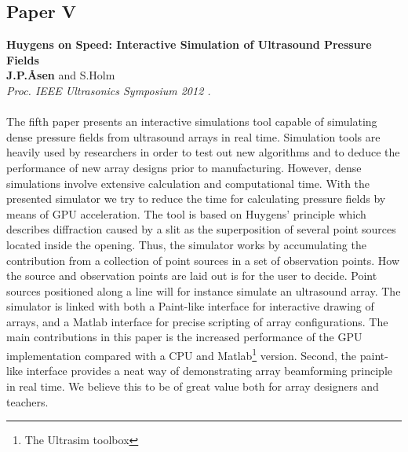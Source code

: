 \subsection{Paper V}
\textbf{Huygens on Speed: Interactive Simulation of Ultrasound Pressure Fields}\\
\textbf{J.\:P.\:\AA{}sen} and S.\:Holm\\
{\it Proc. IEEE Ultrasonics Symposium 2012 .}\\\\
The fifth paper presents an interactive simulations tool capable of simulating dense pressure fields from ultrasound arrays in real time. Simulation tools are heavily used by researchers in order to test out new algorithms and to deduce the performance of new array designs prior to manufacturing. However, dense simulations involve extensive calculation and computational time. With the presented simulator we try to reduce the time for calculating pressure fields by means of GPU acceleration. The tool is based on Huygens' principle which describes diffraction caused by a slit as the superposition of several point sources located inside the opening. Thus, the simulator works by accumulating the contribution from a collection of point sources in a set of observation points. How the source and observation points are laid out is for the user to decide. Point sources positioned along a line will for instance simulate an ultrasound array. The simulator is linked with both a Paint-like interface for interactive drawing of arrays, and a Matlab interface for precise scripting of array configurations. The main contributions in this paper is the increased performance of the GPU implementation compared with a CPU and Matlab\footnote{The Ultrasim toolbox } version. Second, the paint-like interface provides a neat way of demonstrating array beamforming principle in real time. We believe this to be of great value both for array designers and teachers.

